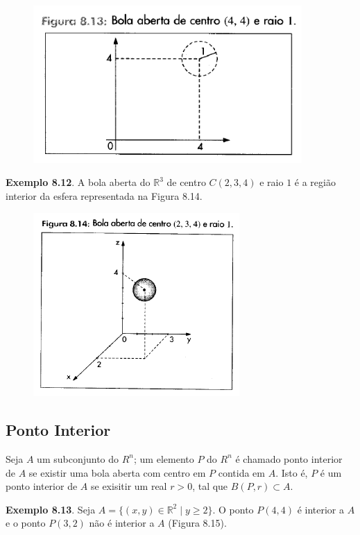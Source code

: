 		\begin{figure}[H]
			\includegraphics[height=6cm]{images/morettin_figura-8-13}
		\end{figure}

				\bigskip

		\textbf{Exemplo 8.12}. A bola aberta do $\mathbb{R}^{3}$ de centro $C(2, 3, 4)$ e raio $1$ é a região interior da esfera representada na Figura 8.14.
		
		\begin{figure}[H]
			\includegraphics[height=7cm]{images/morettin_figura-8-14}
		\end{figure}
		
	\subsection{Ponto Interior \cite{morettin}}

		Seja $A$ um subconjunto do $R^{n}$; um elemento $P$ do $R^{n}$ é chamado ponto interior de $A$ se existir uma bola aberta com centro em $P$ contida em $A$. Isto é, $P$ é um ponto interior de $A$ se exisitir um real $r > 0$, tal que $B(P, r) \subset A$.

		\bigskip

		\textbf{Exemplo 8.13}. Seja $A = \{(x, y) \in \mathbb{R}^2 \mid y \geq 2\}$. O ponto $P(4, 4)$ é interior a $A$ e o ponto $P(3, 2)$ não é interior a $A$ (Figura 8.15).

